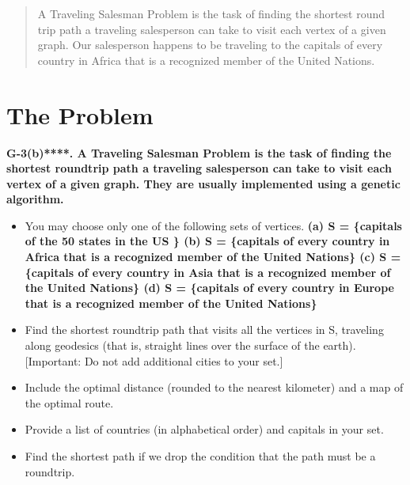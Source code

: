 \documentclass[12pt]{article}
\begin{document}
\maketitle

\begin{abstract}
  A Traveling Salesman Problem is the task of finding
the shortest round trip path a traveling salesperson can take
to visit each vertex of a given graph. Our salesperson
happens to be traveling to the capitals of every country in Africa that is a recognized member of the United Nations.
\end{abstract}

\newpage      
\section{The Problem}
\bf{G-3(b)****. }\normalfont A Traveling Salesman Problem is the task of finding 
the shortest roundtrip path a traveling salesperson can take 
to visit each vertex of a given graph.  They are usually 
implemented using a genetic algorithm.  

\begin{itemize}
\item You may choose only one of the following sets of vertices. \newline
\small
\bf(a) \normalfont \small S = \{capitals of the 50 states in the US \} \newline
\bf(b) \normalfont \small S = \{capitals of every country in Africa that is a recognized member of the United Nations\} \newline
\bf(c) \normalfont \small S = \{capitals of every country in Asia that is a recognized member of the United Nations\} \newline
\bf(d) \normalfont \small S = \{capitals of every country in Europe that is a recognized member of the United Nations\}
\normalfont
\item Find the shortest roundtrip path that visits all the vertices in S, traveling along geodesics (that is, 
straight lines over the surface of the earth).  [Important:  Do not add additional cities to your set.] 
\item Include the optimal distance (rounded to the nearest kilometer) and a map of the optimal route.   
\item Provide a list of countries (in alphabetical order) and capitals in your set. 
\item Find the shortest path if we drop the condition that the path must be a roundtrip. 
\end{itemize}
        
\end{document}
